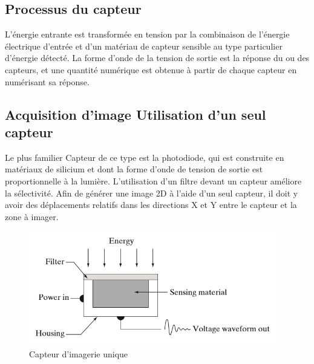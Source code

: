 \documentclass[12pt,a4paper]{report}
\numberwithin{equation}{subsection}
\numberwithin{equation}{section}
\begin{document}
\subsection{Processus du capteur}
L'énergie entrante est transformée en tension par la combinaison de l'énergie électrique d'entrée et d'un matériau de capteur sensible au type particulier d'énergie détecté.  \newline
La forme d'onde de la tension de sortie est la réponse du ou des capteurs, et une quantité numérique est obtenue à partir de chaque capteur en numérisant sa réponse.
\subsection{Acquisition d'image Utilisation d'un seul capteur }
 Le plus familier Capteur de ce type est la photodiode, qui est construite en matériaux de silicium et dont la forme d'onde de tension de sortie est proportionnelle à la lumière. L'utilisation d'un filtre devant un capteur améliore la sélectivité. Afin de générer une image 2D à l'aide d'un seul capteur, il doit y avoir des déplacements relatifs dans les directions X et Y entre le capteur et la zone à imager.
 \begin{figure}[!h]
    \centering
    \begin{center}
        \includegraphics[height=5cm,width=10cm\textwidth]{capteur2.png}
    \end{center}
    \caption{Capteur d'imagerie unique}
\end{figure}
\end{document}
